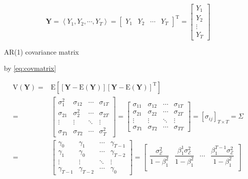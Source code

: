\documentclass[
]{book}
\theoremstyle{definition}
\theoremstyle{definition}
\theoremstyle{definition}
\theoremstyle{definition}
\theoremstyle{remark}
\begin{document}
\[
\boldsymbol{Y}=\left\langle Y_{1},Y_{2},\cdots,Y_{T}\right\rangle =\begin{bmatrix}Y_{1} & Y_{2} & \cdots & Y_{T}\end{bmatrix}^{\mathrm{T}}=\begin{bmatrix}Y_{1}\\
Y_{2}\\
\vdots\\
Y_{T}
\end{bmatrix}
\]

AR(1) covariance matrix

by \eqref{eq:covmatrix}

\[
\begin{aligned}
\mathrm{V}\left(\boldsymbol{Y}\right)= & \mathrm{E}\left[\left[\boldsymbol{Y}-\mathrm{E}\left(\boldsymbol{Y}\right)\right]\left[\boldsymbol{Y}-\mathrm{E}\left(\boldsymbol{Y}\right)\right]^{\mathrm{T}}\right]\\
= & \begin{bmatrix}\sigma_{1}^{2} & \sigma_{12} & \cdots & \sigma_{1T}\\
\sigma_{21} & \sigma_{2}^{2} & \cdots & \sigma_{2T}\\
\vdots & \vdots & \ddots & \vdots\\
\sigma_{T1} & \sigma_{T2} & \cdots & \sigma_{T}^{2}
\end{bmatrix}=\begin{bmatrix}\sigma_{11} & \sigma_{12} & \cdots & \sigma_{1T}\\
\sigma_{21} & \sigma_{22} & \cdots & \sigma_{2T}\\
\vdots & \vdots & \ddots & \vdots\\
\sigma_{T1} & \sigma_{T2} & \cdots & \sigma_{TT}
\end{bmatrix}=\left[\sigma_{ij}\right]_{T\times T}=\mathit{\Sigma}\\
= & \begin{bmatrix}\gamma_{0} & \gamma_{1} & \cdots & \gamma_{T-1}\\
\gamma_{1} & \gamma_{0} & \cdots & \gamma_{T-2}\\
\vdots & \vdots & \ddots & \vdots\\
\gamma_{T-1} & \gamma_{T-2} & \cdots & \gamma_{0}
\end{bmatrix}=\begin{bmatrix}\dfrac{\sigma_{\mathcal{E}}^{2}}{1-\beta_{1}^{2}} & \dfrac{\beta_{1}^{1}\sigma_{\mathcal{E}}^{2}}{1-\beta_{1}^{2}} & \cdots & \dfrac{\beta_{1}^{T-1}\sigma_{\mathcal{E}}^{2}}{1-\beta_{1}^{2}}\\

\end{bmatrix}
\end{aligned}\]
\end{document}
